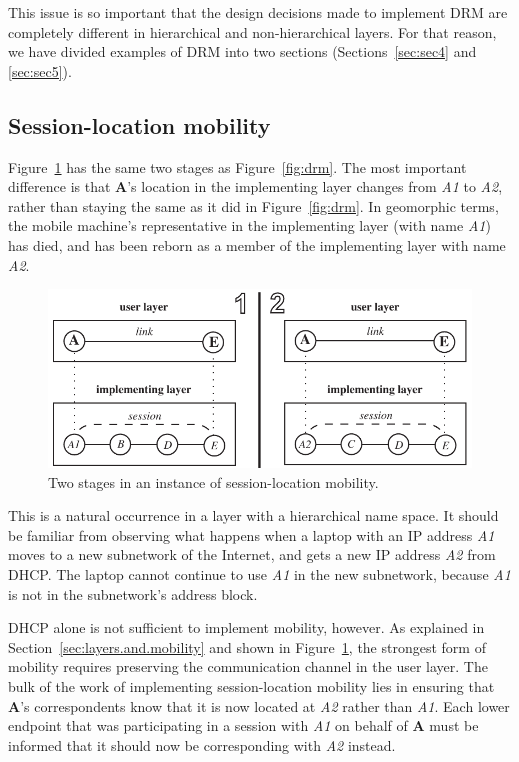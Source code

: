 This issue is so important that the design decisions made to implement
DRM are completely different in hierarchical and non-hierarchical
layers.
For that reason, we have divided examples of DRM into two sections
(Sections~\ref{sec:sec4} and \ref{sec:sec5}).

\subsection{Session-location mobility}
\label{sec:slm}

Figure~\ref{fig:slm} has the same two stages as Figure~\ref{fig:drm}.
The most important
difference is that {\bf A}'s location in the implementing
layer changes from {\it A1} to {\it A2}, rather than staying the same
as it did in Figure~\ref{fig:drm}.
In geomorphic terms, the mobile machine's representative in the
implementing layer (with name {\it A1}) has died, and has been reborn
as a member of the implementing layer with name {\it A2}.

\begin{figure}
\centering
\includegraphics[scale=0.95]{figures/slm.pdf}
\caption{Two stages in an instance of session-location mobility.}
\label{fig:slm}
\end{figure}

This is a natural occurrence in a layer with a hierarchical name
space.
It should be 
familiar from observing what happens
when a laptop with an IP address {\it A1} moves to a new subnetwork
of the Internet, and gets a new IP address {\it A2} from DHCP.
The laptop cannot continue to use {\it A1} in the new subnetwork,
because {\it A1} is not in the subnetwork's address block.

DHCP alone is not sufficient to implement mobility, however.
As explained in Section~\ref{sec:layers.and.mobility}
and shown in Figure~\ref{fig:slm},
the strongest form of mobility requires preserving the 
communication channel in the user layer.
The bulk of the work of implementing session-location mobility lies in 
ensuring that {\bf A}'s correspondents know that it is now located at
{\it A2} rather than {\it A1}.
Each lower endpoint that was participating in a session with {\it A1}
on behalf of {\bf A} must be informed that it should now be corresponding
with {\it A2} instead.

